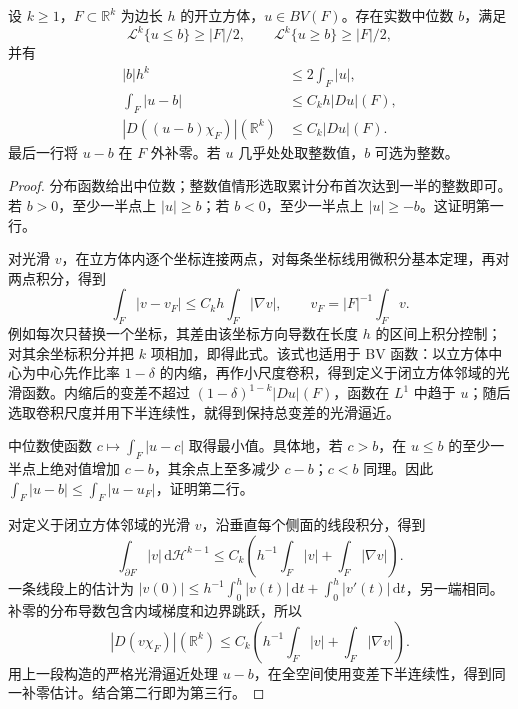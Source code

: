 \begin{lemma}\label{g3:lem:cube-median-bv}
	设 \(k\ge1\)，\(F\subset\mathbb R^k\) 为边长 \(h\) 的开立方体，\(u\in BV(F)\)。存在实数中位数 \(b\)，满足
	\[
	\mathcal L^k\{u\le b\}\ge|F|/2,\qquad
	\mathcal L^k\{u\ge b\}\ge|F|/2,
	\]
	并有
	\begin{equation}\label{g3:eq:cube-median-estimates}
	\begin{aligned}
	|b|h^k&\le2\int_F|u|,\\
	\int_F|u-b|&\le C_kh|Du|(F),\\
	|D((u-b)\chi_F)|(\mathbb R^k)&\le C_k|Du|(F).
	\end{aligned}
	\end{equation}
	最后一行将 \(u-b\) 在 \(F\) 外补零。若 \(u\) 几乎处处取整数值，\(b\) 可选为整数。
\end{lemma}
\begin{proof}
	分布函数给出中位数；整数值情形选取累计分布首次达到一半的整数即可。若 \(b>0\)，至少一半点上 \(|u|\ge b\)；若 \(b<0\)，至少一半点上 \(|u|\ge-b\)。这证明第一行。

	对光滑 \(v\)，在立方体内逐个坐标连接两点，对每条坐标线用微积分基本定理，再对两点积分，得到
	\[
	\int_F|v-v_F|\le C_kh\int_F|\nabla v|,
	\qquad v_F=|F|^{-1}\int_Fv.
	\]
	例如每次只替换一个坐标，其差由该坐标方向导数在长度 \(h\) 的区间上积分控制；对其余坐标积分并把 \(k\) 项相加，即得此式。该式也适用于 BV 函数：以立方体中心为中心先作比率 \(1-\delta\) 的内缩，再作小尺度卷积，得到定义于闭立方体邻域的光滑函数。内缩后的变差不超过
	\((1-\delta)^{1-k}|Du|(F)\)，函数在 \(L^1\) 中趋于 \(u\)；随后选取卷积尺度并用下半连续性，就得到保持总变差的光滑逼近。

	中位数使函数 \(c\mapsto\int_F|u-c|\) 取得最小值。具体地，若 \(c>b\)，在 \(u\le b\) 的至少一半点上绝对值增加 \(c-b\)，其余点上至多减少 \(c-b\)；\(c<b\) 同理。因此
	\(\int_F|u-b|\le\int_F|u-u_F|\)，证明第二行。

	对定义于闭立方体邻域的光滑 \(v\)，沿垂直每个侧面的线段积分，得到
	\[
	\int_{\partial F}|v|\,\mathrm d\mathcal H^{k-1}
	\le C_k\left(h^{-1}\int_F|v|+\int_F|\nabla v|\right).
	\]
	一条线段上的估计为
	\(|v(0)|\le h^{-1}\int_0^h|v(t)|\,\mathrm dt+\int_0^h|v'(t)|\,\mathrm dt\)，另一端相同。补零的分布导数包含内域梯度和边界跳跃，所以
	\[
	|D(v\chi_F)|(\mathbb R^k)
	\le C_k\left(h^{-1}\int_F|v|+\int_F|\nabla v|\right).
	\]
	用上一段构造的严格光滑逼近处理 \(u-b\)，在全空间使用变差下半连续性，得到同一补零估计。结合第二行即为第三行。
\end{proof}

